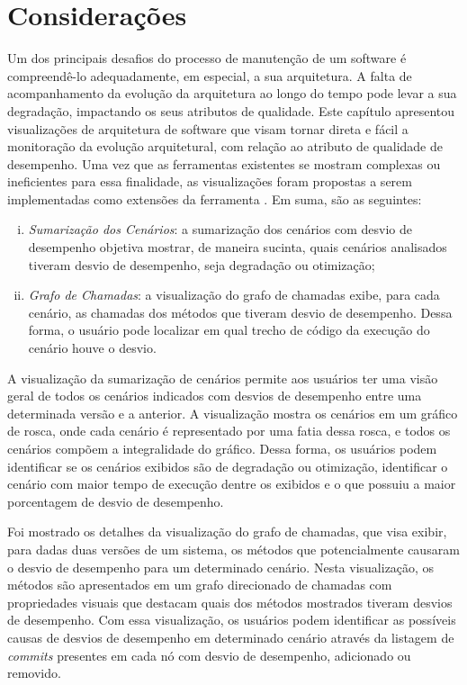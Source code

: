 \section{Considerações} \label{sec:consideracoes-cap3}

Um dos principais desafios do processo de manutenção de um software é compreendê-lo adequadamente, em especial, a sua arquitetura. A falta de acompanhamento da evolução da arquitetura ao longo do tempo pode levar a sua degradação, impactando os seus atributos de qualidade. Este capítulo apresentou visualizações de arquitetura de software que visam tornar direta e fácil a monitoração da evolução arquitetural, com relação ao atributo de qualidade de desempenho. Uma vez que as ferramentas existentes se mostram complexas ou ineficientes para essa finalidade, as visualizações foram propostas a serem implementadas como extensões da ferramenta \textit{\perfMinerName}. Em suma, são as seguintes:
\begin{enumerate}[(i)]
   \item \textit{Sumarização dos Cenários}: a sumarização dos cenários com desvio de desempenho objetiva mostrar, de maneira sucinta, quais cenários analisados tiveram desvio de desempenho, seja degradação ou otimização;
   \item \textit{Grafo de Chamadas}: a visualização do grafo de chamadas exibe, para cada cenário, as chamadas dos métodos que tiveram desvio de desempenho. Dessa forma, o usuário pode localizar em qual trecho de código da execução do cenário houve o desvio.
\end{enumerate}

A visualização da sumarização de cenários permite aos usuários ter uma visão geral de todos os cenários indicados com desvios de desempenho entre uma determinada versão e a anterior. A visualização mostra os cenários em um gráfico de rosca, onde cada cenário é representado por uma fatia dessa rosca, e todos os cenários compõem a integralidade do gráfico. Dessa forma, os usuários podem identificar se os cenários exibidos são de degradação ou otimização, identificar o cenário com maior tempo de execução dentre os exibidos e o que possuiu a maior porcentagem de desvio de desempenho.

Foi mostrado os detalhes da visualização do grafo de chamadas, que visa exibir, para dadas duas versões de um sistema, os métodos que potencialmente causaram o desvio de desempenho para um determinado cenário. Nesta visualização, os métodos são apresentados em um grafo direcionado de chamadas com propriedades visuais que destacam quais dos métodos mostrados tiveram desvios de desempenho. Com essa visualização, os usuários podem identificar as possíveis causas de desvios de desempenho em determinado cenário através da listagem de \textit{commits} presentes em cada nó com desvio de desempenho, adicionado ou removido.